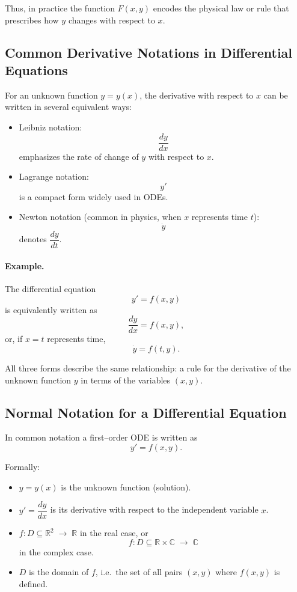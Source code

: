 \documentclass[11pt,a4paper]{article}
\begin{document}
	Thus, in practice the function $F(x,y)$ encodes the physical law or rule that prescribes how $y$ changes with respect to $x$.
	
	
	\subsection*{Common Derivative Notations in Differential Equations}
	
	For an unknown function $y = y(x)$, the derivative with respect to $x$ can be written in several equivalent ways:
	
	\begin{itemize}
		\item Leibniz notation:
		$$
		\frac{dy}{dx}
		$$
		emphasizes the rate of change of $y$ with respect to $x$.
		
		\item Lagrange notation:
		$$
		y'
		$$
		is a compact form widely used in ODEs.
		
		\item Newton notation (common in physics, when $x$ represents time $t$):
		$$
		\dot{y}
		$$
		denotes $\dfrac{dy}{dt}$.
	\end{itemize}
	
	\paragraph{Example.}  
	The differential equation
	$$
	y' = f(x,y)
	$$
	is equivalently written as
	$$
	\frac{dy}{dx} = f(x,y),
	$$
	or, if $x=t$ represents time,
	$$
	\dot{y} = f(t,y).
	$$
	
	All three forms describe the same relationship: a rule for the derivative of the unknown function $y$ in terms of the variables $(x,y)$.
	
	
	\subsection*{Normal Notation for a Differential Equation}
	
	In common notation a first--order ODE is written as
	$$
	y' = f(x,y).
	$$
	
	Formally:
	\begin{itemize}
		\item $y = y(x)$ is the unknown function (solution).
		\item $y' = \dfrac{dy}{dx}$ is its derivative with respect to the independent variable $x$.
		\item $f : D \subseteq \mathbb{R}^2 \;\longrightarrow\; \mathbb{R}$ in the real case, or 
		$$f : D \subseteq \mathbb{R} \times \mathbb{C} \;\longrightarrow\; \mathbb{C}$$
		in the complex case.
		\item $D$ is the domain of $f$, i.e.\ the set of all pairs $(x,y)$ where $f(x,y)$ is defined.
	\end{itemize}
	
\end{document}
